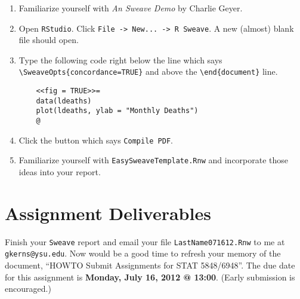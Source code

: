 \documentclass[10pt,english]{article}
\begin{document}
\begin{enumerate}
\item Familiarize yourself with  \emph{An Sweave Demo} by Charlie Geyer.
\item Open \texttt{RStudio}.  Click \texttt{File -> New... -> R Sweave}.  A new (almost) blank file should open.
\item Type the following code right below the line which says \texttt{\textbackslash{}SweaveOpts\{concordance=TRUE\}} and above the \texttt{\textbackslash{}end\{document\}} line. 
\begin{verbatim}
    <<fig = TRUE>>=
    data(ldeaths)
    plot(ldeaths, ylab = "Monthly Deaths")
    @
\end{verbatim}
\item Click the button which says \texttt{Compile PDF}.
\item Familiarize yourself with \texttt{EasySweaveTemplate.Rnw} and incorporate those ideas into your report.
\end{enumerate}
\section*{Assignment Deliverables}
\label{sec-3}

Finish your \texttt{Sweave} report and email your file \texttt{LastName071612.Rnw} to me at \texttt{gkerns@ysu.edu}.  Now would be a good time to refresh your memory of the document, ``HOWTO Submit Assignments for STAT 5848/6948''.  The due date for this assignment is \textbf{Monday, July 16, 2012 @ 13:00}.  (Early submission is encouraged.)
\end{document}
